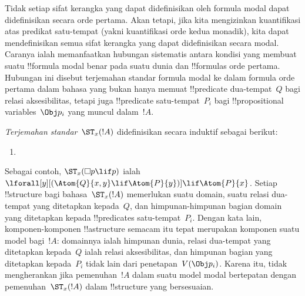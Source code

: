 \documentclass[../../../include/open-logic-section]{subfiles}
\begin{document}


Tidak setiap sifat kerangka yang dapat didefinisikan oleh formula modal dapat
didefinisikan secara orde pertama. Akan tetapi, jika kita mengizinkan
kuantifikasi atas predikat satu-tempat (yakni kuantifikasi orde kedua monadik),
kita dapat mendefinisikan semua sifat kerangka yang dapat didefinisikan secara
modal. Caranya ialah memanfaatkan hubungan sistematis antara kondisi yang
membuat suatu !!{formula} modal benar pada suatu dunia dan !!{formula}s orde
pertama. Hubungan ini disebut terjemahan standar formula modal ke dalam
formula orde pertama dalam bahasa yang bukan hanya memuat !!{predicate}
dua-tempat~$Q$ bagi relasi aksesibilitas, tetapi juga !!{predicate}
satu-tempat~$P_i$ bagi !!{propositional variable}s~$\Obj p_i$ yang muncul
dalam~$!A$.

\begin{defn}
  \emph{Terjemahan standar}~$\ST_x(!A)$ didefinisikan secara induktif sebagai
  berikut:
  \begin{enumerate}
  \item {}
  \end{enumerate}
\end{defn}

Sebagai contoh, $\ST_x(\Box p\lif p)$ ialah
$\lforall[y][(\Atom{Q}{x,y}\lif\Atom{P}{y})]\lif\Atom{P}{x}$. Setiap
!!{structure} bagi bahasa~$\ST_x(!A)$ memerlukan suatu domain, suatu relasi
dua-tempat yang ditetapkan kepada~$Q$, dan himpunan-himpunan bagian domain
yang ditetapkan kepada !!{predicate}s satu-tempat~$P_i$. Dengan kata lain,
komponen-komponen !!a{structure} semacam itu tepat merupakan komponen suatu
model bagi~$!A$: domainnya ialah himpunan dunia, relasi dua-tempat yang
ditetapkan kepada~$Q$ ialah relasi aksesibilitas, dan himpunan bagian yang
ditetapkan kepada~$P_i$ tidak lain dari penetapan~$V(\Obj p_i)$. Karena itu,
tidak mengherankan jika pemenuhan~$!A$ dalam suatu model modal bertepatan
dengan pemenuhan~$\ST_x(!A)$ dalam !!{structure} yang bersesuaian.
\end{document}
